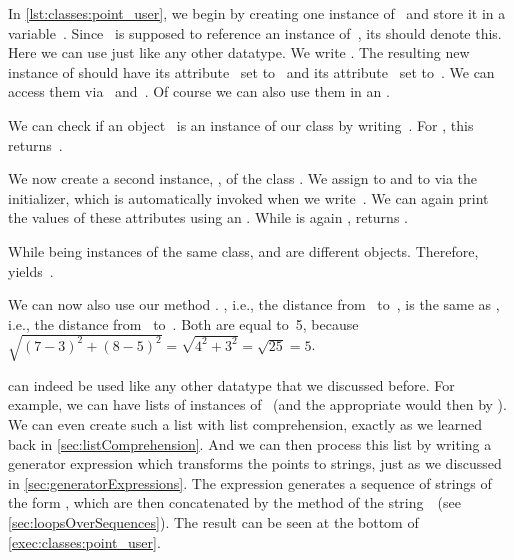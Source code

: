 In \cref{lst:classes:point_user}, we begin by creating one instance of~ and store it in a variable~.
Since~ is supposed to reference an instance of~, its  should denote this.
Here we can use  just like any other datatype.
We write .
The resulting new instance of  should have its attribute~ set to~ and its attribute~ set to~.
We can access them via~ and~.
Of course we can also use them in an .

We can check if an object~ is an instance of our class  by writing~.
For , this returns~.

We now create a second instance, , of the class .
We assign  to  and  to  via the  initializer, which is automatically invoked when we write~.
We can again print the values of these attributes using an .
While  is again ,  returns .

While being instances of the same class,  and  are different objects.
Therefore,  yields~.%
%
\begin{sloppypar}%
We can now also use our method .
, i.e., the distance from~ to~, is the same as , i.e., the distance from~ to~.
Both are equal to~5, because~$\sqrt{(7 - 3)^2+ (8 - 5)^2}=\sqrt{4^2 + 3^2}=\sqrt{25}=5$.%
\end{sloppypar}%
%
 can indeed be used like any other datatype that we discussed before.
For example, we can have lists of instances of ~(and the appropriate  would then by ).
We can even create such a list with list comprehension, exactly as we learned back in \cref{sec:listComprehension}.
And we can then process this list by writing a generator expression which transforms the points to strings, just as we discussed in \cref{sec:generatorExpressions}.
The expression generates a sequence of strings of the form , which are then concatenated by the  method of the string~~(see \cref{sec:loopsOverSequences}).
The result can be seen at the bottom of \cref{exec:classes:point_user}.

